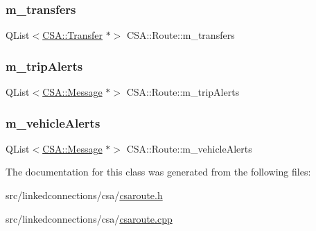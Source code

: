 \mbox{\label{classCSA_1_1Route_a6cda1eec2815597d04332dc00aa02cb5}} 
\subsubsection{\texorpdfstring{m\+\_\+transfers}{m\_transfers}}
{\footnotesize\ttfamily Q\+List$<$\mbox{\hyperlink{classCSA_1_1Transfer}{C\+S\+A\+::\+Transfer}} $\ast$$>$ C\+S\+A\+::\+Route\+::m\+\_\+transfers\hspace{0.3cm}{\ttfamily [private]}}

\mbox{\label{classCSA_1_1Route_a2cc92adcc76332a90cc74816797bed61}} 
\subsubsection{\texorpdfstring{m\+\_\+trip\+Alerts}{m\_tripAlerts}}
{\footnotesize\ttfamily Q\+List$<$\mbox{\hyperlink{classCSA_1_1Message}{C\+S\+A\+::\+Message}} $\ast$$>$ C\+S\+A\+::\+Route\+::m\+\_\+trip\+Alerts\hspace{0.3cm}{\ttfamily [private]}}

\mbox{\label{classCSA_1_1Route_a1212f056c45451fa3df603fa1f69e7f4}} 
\subsubsection{\texorpdfstring{m\+\_\+vehicle\+Alerts}{m\_vehicleAlerts}}
{\footnotesize\ttfamily Q\+List$<$\mbox{\hyperlink{classCSA_1_1Message}{C\+S\+A\+::\+Message}} $\ast$$>$ C\+S\+A\+::\+Route\+::m\+\_\+vehicle\+Alerts\hspace{0.3cm}{\ttfamily [private]}}



The documentation for this class was generated from the following files\+:\begin{DoxyCompactItemize}
\item 
src/linkedconnections/csa/\mbox{\hyperlink{csaroute_8h}{csaroute.\+h}}\item 
src/linkedconnections/csa/\mbox{\hyperlink{csaroute_8cpp}{csaroute.\+cpp}}\end{DoxyCompactItemize}
